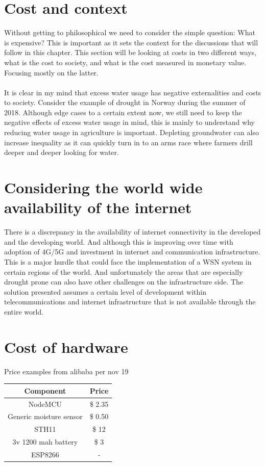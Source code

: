 \documentclass[]{uiophd}
\begin{document}
\section{Cost and context}
Without getting to philosophical we need to consider the simple question: What is expensive? This is important as it sets the context for the discussions that will follow in this chapter. This section will be looking at costs in two different ways, what is the cost to society, and what is the cost measured in monetary value. Focusing mostly on the latter. 
\\\\
It is clear in my mind that excess water usage has negative externalities and costs to society. Consider the  example of drought in Norway during the summer of 2018. Although edge cases to a certain extent now, we still need to keep the negative effects of excess water usage in mind, this is mainly to understand why reducing water usage in agriculture is important. Depleting groundwater can also increase inequality as it can quickly turn in to an arms race where farmers drill deeper and deeper looking for water.
\section{Considering the world wide availability of the internet}
There is a discrepancy in the availability of internet connectivity in the developed and the developing world. And although this is improving over time with adoption of 4G/5G and investment in internet and communication infrastructure. This is a major hurdle that could face the implementation of a WSN system in certain regions of the world. And unfortunately the areas that are especially drought prone can also have other challenges on the infrastructure side. The solution presented assumes a certain level of development within telecommunications and internet infrastructure that is not available through the entire world.
\section{Cost of hardware}

Price examples from alibaba per nov 19

\begin{center}
 \begin{tabular}{||c | c||} 
 \hline
 Component & Price \\ [0.5ex] 
 \hline\hline
 NodeMCU & \$ 2.35 \\ 
 \hline
 Generic moisture sensor & \$ 0.50 \\
 \hline
 STH11 & \$ 12 \\
 \hline
 3v 1200 mah battery & \$ 3 \\
 \hline
 ESP8266 & - \\ [1ex] 
 \hline
\end{tabular}
\end{center}
\end{document}
